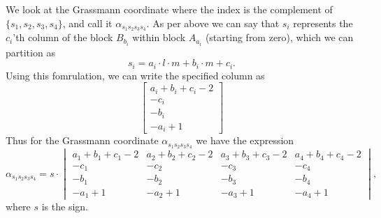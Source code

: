 \documentclass[a4paper,12pt]{book}
\theoremstyle{plain}
\theoremstyle{definition}
\begin{document}
We look at the Grassmann coordinate where the index is the complement of
\( \{s_1, s_2, s_3, s_4\} \), and call it \( \alpha_{s_1 s_2 s_3 s_4} \).
As per above we can say that \( s_i \) represents the \( c_i \)'th column
of the block \( B_{b_i} \) within block \( A_{a_i} \) (starting from zero), 
which we can partition
as
\[
	s_i = a_i \cdot l \cdot m + b_i \cdot m + c_i.
\]
Using this fomrulation, we can write the specified column as
\[
	\begin{bmatrix}
		a_i + b_i + c_i - 2\\
		-c_i\\
		-b_i \\
		-a_i + 1
	\end{bmatrix}
\]
Thus for the Grassmann coordinate \( \alpha_{s_1 s_2 s_3 s_4} \) we have
the expression
\[
	\alpha_{s_1 s_2 s_3 s_4} = s \cdot \begin{vmatrix}
		a_1 + b_1 + c_1 - 2 & a_2 + b_2 + c_2 - 2 & a_3 + b_3 + c_3 - 2 & 
		a_4 + b_4 + c_4 - 2 \\
		-c_1 & -c_2 & -c_3 & -c_4 \\
		-b_1 & -b_2 & -b_3 & -b_4 \\
		-a_1 + 1 & -a_2 + 1 & -a_3 + 1 & -a_4 + 1
	\end{vmatrix},
\]
where \( s \) is the sign.
\end{document}
